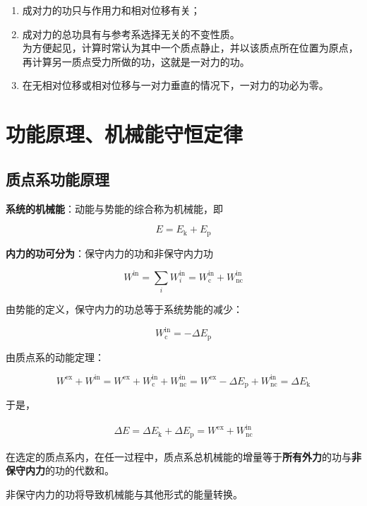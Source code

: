 \documentclass[
	12pt, %
	a4paper, %
]{myLegrandOrangeBook}
\begin{document}
    \begin{enumerate}
        \item 成对力的功只与作用力和相对位移有关；
        \item 成对力的总功具有与参考系选择无关的不变性质。\\
            为方便起见，计算时常认为其中一个质点静止，并以该质点所在位置为原点，
            再计算另一质点受力所做的功，这就是一对力的功。
        \item 在无相对位移或相对位移与一对力垂直的情况下，一对力的功必为零。
    \end{enumerate}

    \section{功能原理、机械能守恒定律}

    \subsection{质点系功能原理}

    \textbf{系统的机械能}：动能与势能的综合称为机械能，即

    \[
        E = E_{\mathrm{k}} + E_{\mathrm{p}}
    \]

    \textbf{内力的功可分为}：保守内力的功和非保守内力功

    \[
        W^{\mathrm{in}} = \sum_{i} W_{i}^{\mathrm{in}} =
        W_{\mathrm{c}}^{\mathrm{in}} + W_{\mathrm{nc}}^{\mathrm{in}}
    \]

    由势能的定义，保守内力的功总等于系统势能的减少：

    \[
        W_{\mathrm{c}}^{\mathrm{in}} = - \Delta E_{\mathrm{p}}
    \]

    \begin{theorem}[系统的功能原理]

        由质点系的动能定理：

        \[
            W^{\mathrm{ex}} + W^{\mathrm{in}} = W^{\mathrm{ex}} + W_{\mathrm{c}}^{\mathrm{in}}
            + W_{\mathrm{nc}}^{\mathrm{in}} = W^{\mathrm{ex}} - \Delta E_{\mathrm{p}} +
            W_{\mathrm{nc}}^{\mathrm{in}} = \Delta E_{\mathrm{k}}
        \]

        于是，

        \begin{align}
            \Delta E = \Delta E_{\mathrm{k}} + \Delta E_{\mathrm{p}} =
            W^{\mathrm{ex}} + W_{\mathrm{nc}}^{\mathrm{in}}
        \end{align}

        在选定的质点系内，在任一过程中，质点系总机械能的增量等于\textbf{所有外力}的功与\textbf{非保守内力}的功的代数和。

        非保守内力的功将导致机械能与其他形式的能量转换。

    \end{theorem}
\end{document}
